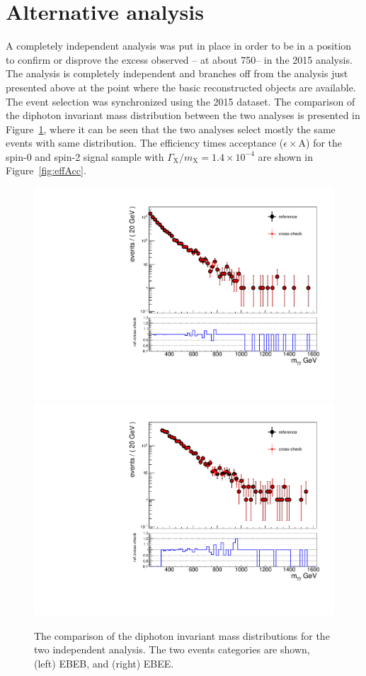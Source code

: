 \section{Alternative analysis}
A completely independent analysis was put in place in order to be in a
position to confirm or disprove the excess observed -- at about
750\GeV --  in the 2015
analysis. The analysis is completely independent and branches off from
the analysis just presented above at the point where the basic reconstructed
objects are available. The event selection was synchronized using the
2015 dataset. The comparison of the diphoton invariant mass
distribution between the two analyses is presented in
Figure~\ref{fig:diphotonComparison}, where it can be seen that the two
analyses select mostly the same events with same distribution. The
efficiency times acceptance ($\epsilon\times\mathrm{A}$) for the spin-0
and spin-2 signal sample with  $\Gamma_{\mathrm{X}}/m_{\mathrm{X}} =
1.4\times10^{-4}$ are shown in Figure~\ref{fig:effAcc}.
\begin{figure}[htb]
    \centering
    \includegraphics[width=\cmsFigWidth]{HighMassDiphoton/dataReferenceEBEB.pdf}
    \includegraphics[width=\cmsFigWidth]{HighMassDiphoton/dataReferenceEBEE.pdf} 
    \caption{The comparison of the diphoton invariant mass
      distributions for the two independent analysis. The two events
      categories are shown, (left) EBEB, and (right) EBEE.
      \label{fig:diphotonComparison}
    }
\end{figure}
